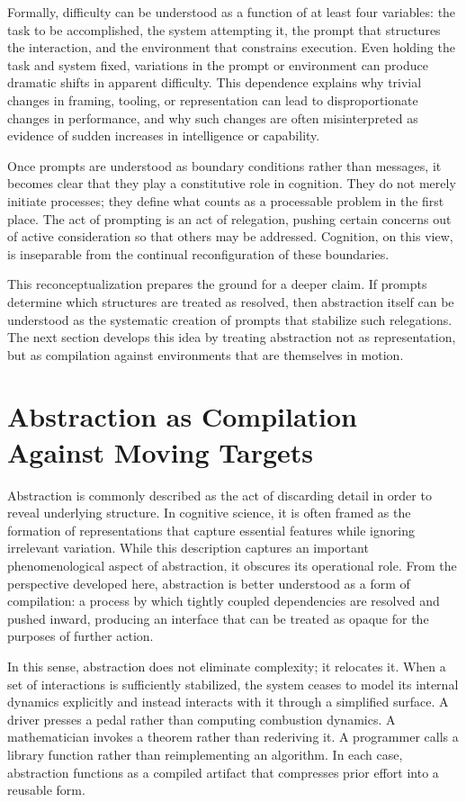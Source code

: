 \documentclass[12pt]{article}
\begin{document}
Formally, difficulty can be understood as a function of at least four variables: the task to be accomplished, the system attempting it, the prompt that structures the interaction, and the environment that constrains execution. Even holding the task and system fixed, variations in the prompt or environment can produce dramatic shifts in apparent difficulty. This dependence explains why trivial changes in framing, tooling, or representation can lead to disproportionate changes in performance, and why such changes are often misinterpreted as evidence of sudden increases in intelligence or capability.

Once prompts are understood as boundary conditions rather than messages, it becomes clear that they play a constitutive role in cognition. They do not merely initiate processes; they define what counts as a processable problem in the first place. The act of prompting is an act of relegation, pushing certain concerns out of active consideration so that others may be addressed. Cognition, on this view, is inseparable from the continual reconfiguration of these boundaries.

This reconceptualization prepares the ground for a deeper claim. If prompts determine which structures are treated as resolved, then abstraction itself can be understood as the systematic creation of prompts that stabilize such relegations. The next section develops this idea by treating abstraction not as representation, but as compilation against environments that are themselves in motion.

\section{Abstraction as Compilation Against Moving Targets}

Abstraction is commonly described as the act of discarding detail in order to reveal underlying structure. In cognitive science, it is often framed as the formation of representations that capture essential features while ignoring irrelevant variation. While this description captures an important phenomenological aspect of abstraction, it obscures its operational role. From the perspective developed here, abstraction is better understood as a form of compilation: a process by which tightly coupled dependencies are resolved and pushed inward, producing an interface that can be treated as opaque for the purposes of further action.

In this sense, abstraction does not eliminate complexity; it relocates it. When a set of interactions is sufficiently stabilized, the system ceases to model its internal dynamics explicitly and instead interacts with it through a simplified surface. A driver presses a pedal rather than computing combustion dynamics. A mathematician invokes a theorem rather than rederiving it. A programmer calls a library function rather than reimplementing an algorithm. In each case, abstraction functions as a compiled artifact that compresses prior effort into a reusable form.
\end{document}
